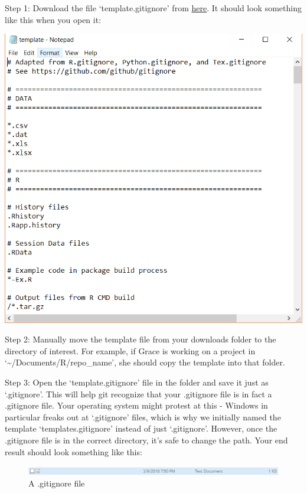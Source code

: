 \documentclass[
]{book}
\begin{document}
Step 1: Download the file `template.gitignore' from \href{https://github.com/IQSS/Rbuild/blob/master/template.gitignore}{here}. It should look something like this when you open it:

\includegraphics{images/gitignore.PNG}

Step 2: Manually move the template file from your downloads folder to the directory of interest. For example, if Grace is working on a project in `\textasciitilde/Documents/R/repo\_name', she should copy the template into that folder.

Step 3: Open the `template.gitignore' file in the folder and save it just as `.gitignore'. This will help git recognize that your .gitignore file is in fact a .gitignore file. Your operating system might protest at this - Windows in particular freaks out at `.gitignore' files, which is why we initially named the template `templates.gitignore' instead of just `.gitignore'. However, once the .gitignore file is in the correct directory, it's safe to change the path. Your end result should look something like this:

\begin{figure}
\centering
\includegraphics{images/gitignore2.PNG}
\caption{A .gitignore file}
\end{figure}
\end{document}
